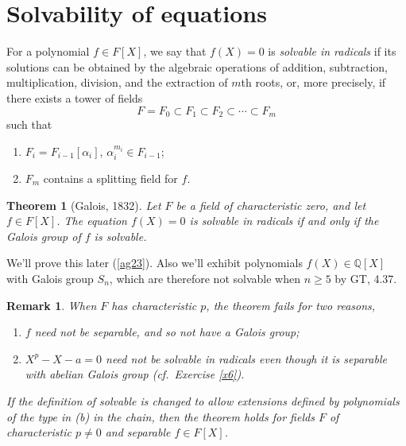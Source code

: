 \documentclass[a4paper,11pt,final,openany]{memoir}
\newtheorem{theorem}[X]{Theorem}
\newtheorem{remark}[X]{Remark}
\theoremstyle{nonumberplain}
\begin{document}
\section{Solvability of equations}

For a polynomial $f\in F[X]$, we say that $f(X)=0$ is \emph{solvable in
radicals }%
%
if its solutions can be obtained by the algebraic operations of addition,
subtraction, multiplication, division, and the extraction of $m$th roots, or,
more precisely, if there exists a tower of fields%
\[
F=F_{0}\subset F_{1}\subset F_{2}\subset\cdots\subset F_{m}%
\]
such that

\begin{enumerate}
\item $F_{i}=F_{i-1}[\alpha_{i}]$, $\alpha_{i}^{m_{i}}\in F_{i-1}$;

\item $F_{m}$ contains a splitting field for $f.$
\end{enumerate}

\begin{theorem}
[Galois, 1832]\label{ft25}%
%
Let $F$ be a field of characteristic zero, and let $f\in F[X]$. The equation
$f(X)=0$ is solvable in radicals if and only if the Galois group of $f$ is solvable.
\end{theorem}

We'll prove this later (\ref{ag23}). Also we'll exhibit polynomials
$f(X)\in\mathbb{Q}[X]$ with Galois group $S_{n}$, which are therefore not
solvable when $n\geq5$ by GT, 4.37.

\begin{remark}
\label{ft26}When $F$ has characteristic $p$, the theorem fails for two reasons,

\begin{enumerate}
\item $f$ need not be separable, and so not have a Galois group;

\item $X^{p}-X-a=0$ need not be solvable in radicals even though it is
separable with abelian Galois group (cf.\ Exercise \ref{x6}).
\end{enumerate}

\noindent If the definition of solvable is changed to allow extensions defined
by polynomials of the type in (b) in the chain, then the theorem holds for
fields $F$ of characteristic $p\neq0$ and separable $f\in F[X]$.
\end{remark}
\end{document}
